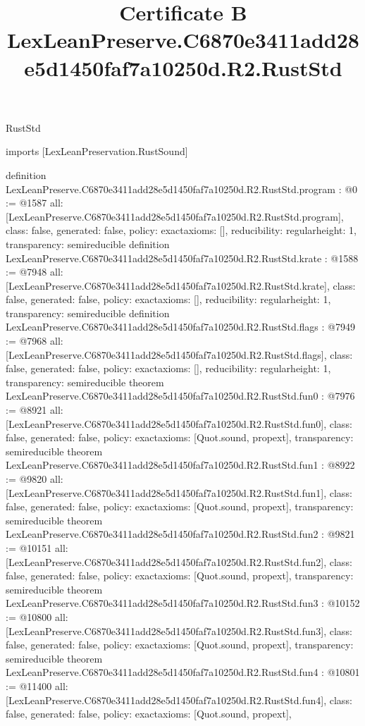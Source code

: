 \begin{lexlean}{RustStd}
\title{Certificate B LexLeanPreserve.C6870e3411add28e5d1450faf7a10250d.R2.RustStd}
\begin{coremodule}
imports [LexLeanPreservation.RustSound]

definition LexLeanPreserve.C6870e3411add28e5d1450faf7a10250d.R2.RustStd.program : @0 := @1587 {
  all: [LexLeanPreserve.C6870e3411add28e5d1450faf7a10250d.R2.RustStd.program],
  class: false,
  generated: false,
  policy: exact{axioms: []},
  reducibility: regular{height: 1},
  transparency: semireducible
}
definition LexLeanPreserve.C6870e3411add28e5d1450faf7a10250d.R2.RustStd.krate : @1588 := @7948 {
  all: [LexLeanPreserve.C6870e3411add28e5d1450faf7a10250d.R2.RustStd.krate],
  class: false,
  generated: false,
  policy: exact{axioms: []},
  reducibility: regular{height: 1},
  transparency: semireducible
}
definition LexLeanPreserve.C6870e3411add28e5d1450faf7a10250d.R2.RustStd.flags : @7949 := @7968 {
  all: [LexLeanPreserve.C6870e3411add28e5d1450faf7a10250d.R2.RustStd.flags],
  class: false,
  generated: false,
  policy: exact{axioms: []},
  reducibility: regular{height: 1},
  transparency: semireducible
}
theorem LexLeanPreserve.C6870e3411add28e5d1450faf7a10250d.R2.RustStd.fun0 : @7976 := @8921 {
  all: [LexLeanPreserve.C6870e3411add28e5d1450faf7a10250d.R2.RustStd.fun0],
  class: false,
  generated: false,
  policy: exact{axioms: [Quot.sound, propext]},
  transparency: semireducible
}
theorem LexLeanPreserve.C6870e3411add28e5d1450faf7a10250d.R2.RustStd.fun1 : @8922 := @9820 {
  all: [LexLeanPreserve.C6870e3411add28e5d1450faf7a10250d.R2.RustStd.fun1],
  class: false,
  generated: false,
  policy: exact{axioms: [Quot.sound, propext]},
  transparency: semireducible
}
theorem LexLeanPreserve.C6870e3411add28e5d1450faf7a10250d.R2.RustStd.fun2 : @9821 := @10151 {
  all: [LexLeanPreserve.C6870e3411add28e5d1450faf7a10250d.R2.RustStd.fun2],
  class: false,
  generated: false,
  policy: exact{axioms: [Quot.sound, propext]},
  transparency: semireducible
}
theorem LexLeanPreserve.C6870e3411add28e5d1450faf7a10250d.R2.RustStd.fun3 : @10152 := @10800 {
  all: [LexLeanPreserve.C6870e3411add28e5d1450faf7a10250d.R2.RustStd.fun3],
  class: false,
  generated: false,
  policy: exact{axioms: [Quot.sound, propext]},
  transparency: semireducible
}
theorem LexLeanPreserve.C6870e3411add28e5d1450faf7a10250d.R2.RustStd.fun4 : @10801 := @11400 {
  all: [LexLeanPreserve.C6870e3411add28e5d1450faf7a10250d.R2.RustStd.fun4],
  class: false,
  generated: false,
  policy: exact{axioms: [Quot.sound, propext]},
}
\end{coremodule}
\end{lexlean}
